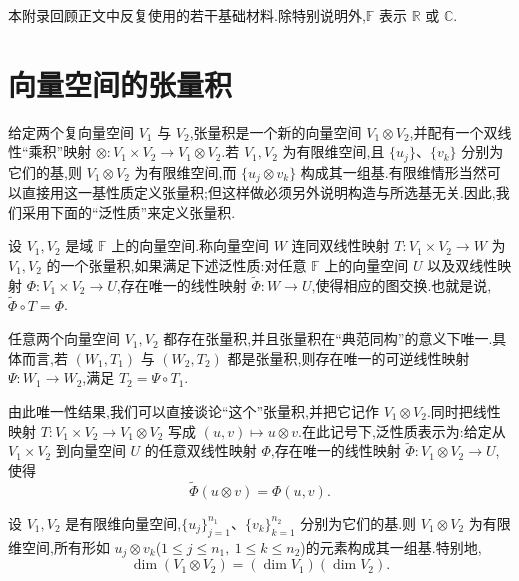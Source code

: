 本附录回顾正文中反复使用的若干基础材料.除特别说明外,\(\mathbb F\) 表示 \(\mathbb R\) 或 \(\mathbb C\).

\section{向量空间的张量积}

给定两个复向量空间 \(V_1\) 与 \(V_2\),张量积是一个新的向量空间 \(V_1\otimes V_2\),并配有一个双线性“乘积”映射
\(\otimes:V_1\times V_2\to V_1\otimes V_2\).若 \(V_1,V_2\) 为有限维空间,且 \(\{u_j\}\)、\(\{v_k\}\) 分别为它们的基,则 \(V_1\otimes V_2\) 为有限维空间,而 \(\{u_j\otimes v_k\}\) 构成其一组基.有限维情形当然可以直接用这一基性质定义张量积;但这样做必须另外说明构造与所选基无关.因此,我们采用下面的“泛性质”来定义张量积.

\begin{definition}[张量积的泛性质]\label{app:def:tensor}
设 \(V_1,V_2\) 是域 \(\mathbb F\) 上的向量空间.称向量空间 \(W\) 连同双线性映射 \(T:V_1\times V_2\to W\) 为 \(V_1,V_2\) 的一个张量积,如果满足下述泛性质:对任意 \(\mathbb F\) 上的向量空间 \(U\) 以及双线性映射 \(\Phi:V_1\times V_2\to U\),存在唯一的线性映射 \(\widetilde\Phi:W\to U\),使得相应的图交换.也就是说,\(\widetilde\Phi\circ T=\Phi\).
\end{definition}

\begin{proposition}[张量积的存在性与唯一性]\label{app:prop:tensor-existence}
任意两个向量空间 \(V_1,V_2\) 都存在张量积,并且张量积在“典范同构”的意义下唯一.具体而言,若 \((W_1,T_1)\) 与 \((W_2,T_2)\) 都是张量积,则存在唯一的可逆线性映射 \(\Psi:W_1\to W_2\),满足 \(T_2=\Psi\circ T_1\).
\end{proposition}

由此唯一性结果,我们可以直接谈论“这个”张量积,并把它记作 \(V_1\otimes V_2\).同时把线性映射 \(T:V_1\times V_2\to V_1\otimes V_2\) 写成 \((u,v)\mapsto u\otimes v\).在此记号下,泛性质表示为:给定从 \(V_1\times V_2\) 到向量空间 \(U\) 的任意双线性映射 \(\Phi\),存在唯一的线性映射 \(\widetilde\Phi:V_1\otimes V_2\to U\),使得
\[
\widetilde\Phi(u\otimes v)=\Phi(u,v).
\]

\begin{proposition}[有限维张量积的基]\label{app:prop:tensor-basis}
设 \(V_1,V_2\) 是有限维向量空间,\(\{u_j\}_{j=1}^{n_1}\)、\(\{v_k\}_{k=1}^{n_2}\) 分别为它们的基.则 \(V_1\otimes V_2\) 为有限维空间,所有形如 \(u_j\otimes v_k\)(\(1\le j\le n_1,\ 1\le k\le n_2\))的元素构成其一组基.特别地,
\[
\dim(V_1\otimes V_2)=(\dim V_1)(\dim V_2).
\]
\end{proposition}

